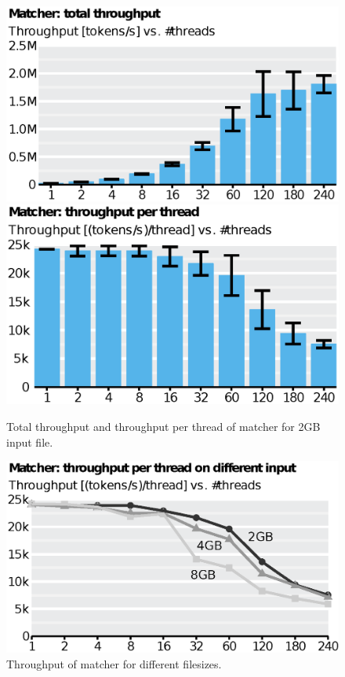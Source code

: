 \begin{figure}
      \includegraphics[scale=.45]{img/def/matcher_tp_total.eps}
      \includegraphics[scale=.45]{img/def/matcher_tp_per_thread.eps}
    \caption{Total throughput and throughput per thread of matcher 
    for 2GB input file.}
      \label{fig:matchertp}%
\end{figure}

\begin{figure}
    \includegraphics[scale=.45]{img/def/matcher_tp_compare.eps}
    \caption{Throughput of matcher for different filesizes.}
    \label{fig:tkmatchercomp}
\end{figure}

